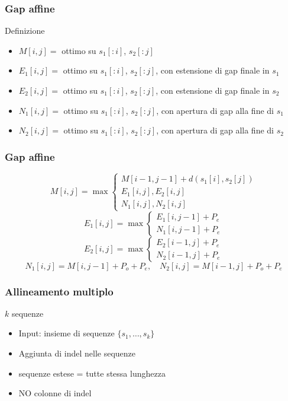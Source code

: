 \begin{frame}[fragile]
\frametitle{Gap affine}
\begin{block}{Definizione}
\begin{itemize}
\item
$M[i,j] = $ ottimo su $s_{1}[:i]$, $s_{2}[:j]$
\item
$E_{1}[i,j] = $ ottimo su $s_{1}[:i]$, $s_{2}[:j]$, con estensione di gap finale
in $s_{1}$
\item
$E_{2}[i,j] = $ ottimo su $s_{1}[:i]$, $s_{2}[:j]$, con estensione di gap finale
in $s_{2}$
\item
$N_{1}[i,j] = $ ottimo su $s_{1}[:i]$, $s_{2}[:j]$, con apertura di gap alla
fine di $s_{1}$
\item
$N_{2}[i,j] = $ ottimo su $s_{1}[:i]$, $s_{2}[:j]$, con apertura di gap alla
fine di $s_{2}$
\end{itemize}
\end{block}
\end{frame}

\begin{frame}[fragile]
\frametitle{Gap affine}
\begin{equation*}
M[i,j] = \max \left\{
\begin{array}{l}%
M[i-1, j-1] + d(s_{1}[i], s_{2}[j])\\
E_{1}[i,j],
E_{2}[i,j] \\
N_{1}[i,j],
N_{2}[i,j]
\end{array}
\right.
\end{equation*}
\begin{equation*}
E_{1}[i,j] = \max \left\{
\begin{array}{l}%
E_{1}[i,j-1] + P_{e}\\
N_{1}[i,j-1] + P_{e}
\end{array}
\right.
\end{equation*}
\begin{equation*}
E_{2}[i,j] = \max \left\{
\begin{array}{l}%
E_{2}[i-1,j] + P_{e} \\
N_{2}[i-1,j] + P_{e}
\end{array}
\right.
\end{equation*}
\begin{equation*}
N_{1}[i,j] = M[i,j-1] + P_{o} + P_{e}, \quad
N_{2}[i,j] = M[i-1,j] + P_{o} + P_{e}
\end{equation*}
\end{frame}

\begin{frame}[fragile]
\frametitle{Allineamento multiplo}
\begin{block}{$k$ sequenze}
\begin{itemize}[<+->]
\item
Input: insieme di sequenze $\{s_{1}, \ldots , s_{k}\}$
\item
Aggiunta di \alert{indel} nelle sequenze
\item
sequenze estese = tutte stessa lunghezza
\item
NO colonne di indel
\end{itemize}
\end{block}
\end{frame}

